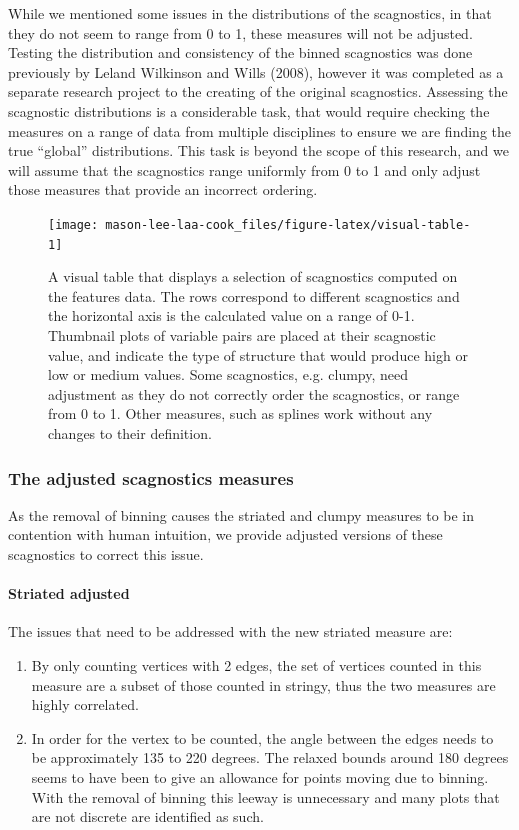 While we mentioned some issues in the distributions of the scagnostics, in that they do not seem to range from 0 to 1, these measures will not be adjusted. Testing the distribution and consistency of the binned scagnostics was done previously by Leland Wilkinson and Wills (2008), however it was completed as a separate research project to the creating of the original scagnostics. Assessing the scagnostic distributions is a considerable task, that would require checking the measures on a range of data from multiple disciplines to ensure we are finding the true ``global'' distributions. This task is beyond the scope of this research, and we will assume that the scagnostics range uniformly from 0 to 1 and only adjust those measures that provide an incorrect ordering.

\begin{figure}
\texttt{[image: mason-lee-laa-cook\_files/figure-latex/visual-table-1]} \caption{A visual table that displays a selection of scagnostics computed on the features data. The rows correspond to different scagnostics and the horizontal axis is the calculated value on a range of 0-1. Thumbnail plots of variable pairs are placed at their scagnostic value, and indicate the type of structure that would produce high or low or medium values. Some scagnostics, e.g. clumpy, need adjustment as they do not correctly order the scagnostics, or range from 0 to 1. Other measures, such as splines work without any changes to their definition.}\label{fig:visual-table}
\end{figure}

\hypertarget{the-adjusted-scagnostics-measures}{%
\subsubsection{The adjusted scagnostics measures}\label{the-adjusted-scagnostics-measures}}

As the removal of binning causes the striated and clumpy measures to be in contention with human intuition, we provide adjusted versions of these scagnostics to correct this issue.

\hypertarget{striated-adjusted}{%
\paragraph{Striated adjusted}\label{striated-adjusted}}

The issues that need to be addressed with the new striated measure are:

\begin{enumerate}
\def\labelenumi{\arabic{enumi}.}
\tightlist
\item
  By only counting vertices with 2 edges, the set of vertices counted in this measure are a subset of those counted in stringy, thus the two measures are highly correlated.
\item
  In order for the vertex to be counted, the angle between the edges needs to be approximately 135 to 220 degrees. The relaxed bounds around 180 degrees seems to have been to give an allowance for points moving due to binning. With the removal of binning this leeway is unnecessary and many plots that are not discrete are identified as such.
\end{enumerate}

